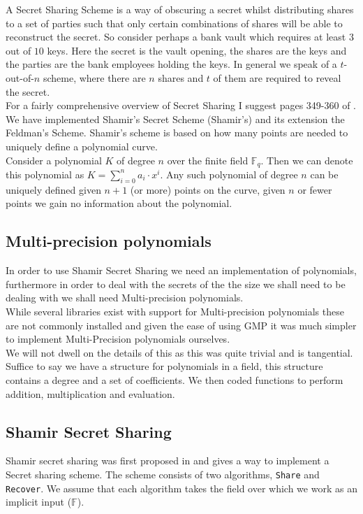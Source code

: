 \documentclass[ %
                    author={Nicholas Tutte},
                supervisor={Prof. Nigel Smart},
                    degree={MEng},
                     title={Secure Two Party Computation},
                  subtitle={A practical comparison of recent protocols},
                      type={Research - GG1K},
                      year={2015} ]{dissertation}
\begin{document}
\begin{appendices}
				A Secret Sharing Scheme is a way of obscuring a secret whilst distributing shares to a set of parties such that only certain combinations of shares will be able to reconstruct the secret. So consider perhaps a bank vault which requires at least $3$ out of $10$ keys. Here the secret is the vault opening, the shares are the keys and the parties are the bank employees holding the keys. In general we speak of a $t$-out-of-$n$ scheme, where there are $n$ shares and $t$ of them are required to reveal the secret.\\

				For a fairly comprehensive overview of Secret Sharing I suggest pages 349-360 of \cite{NigelCryptoBook}.\\

				We have implemented Shamir's Secret Scheme (Shamir's) and its extension the Feldman's Scheme. Shamir's scheme is based on how many points are needed to uniquely define a polynomial curve.\\

				Consider a polynomial $K$ of degree $n$ over the finite field $\mathbb{F}_q$. Then we can denote this polynomial as $K = \sum_{i=0}^{n} a_i \cdot x ^ i$. Any such polynomial of degree $n$ can be uniquely defined given $n+1$ (or more) points on the curve, given $n$ or fewer points we gain no information about the polynomial.

				\subsection{Multi-precision polynomials}
					In order to use Shamir Secret Sharing we need an implementation of polynomials, furthermore in order to deal with the secrets of the the size we shall need to be dealing with we shall need Multi-precision polynomials.\\
					
					While several libraries exist with support for Multi-precision polynomials these are not commonly installed and given the ease of using GMP it was much simpler to implement Multi-Precision polynomials ourselves.\\

					We will not dwell on the details of this as this was quite trivial and is tangential. Suffice to say we have a structure for polynomials in a field, this structure contains a degree and a set of coefficients. We then coded functions to perform addition, multiplication and evaluation.

				\subsection{Shamir Secret Sharing}
					Shamir secret sharing was first proposed in \cite{ShamirSecretSharing} and gives a way to implement a Secret sharing scheme. The scheme consists of two algorithms, \texttt{Share} and \texttt{Recover}. We assume that each algorithm takes the field over which we work as an implicit input ($\mathbb{F}$).\\


\end{appendices}
\end{document}
